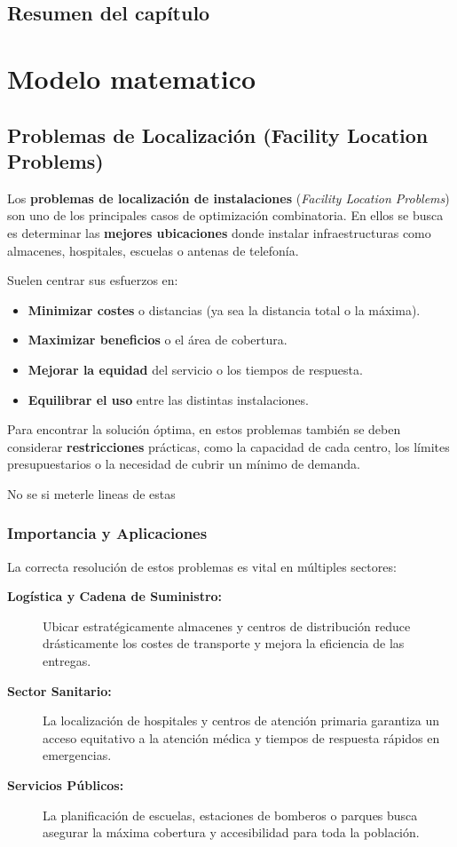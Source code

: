\documentclass[12pt,a4paper]{book}
\begin{document}
\section{Resumen del capítulo}

\chapter{Modelo matematico}

\section{Problemas de Localización (Facility Location Problems)}

Los \textbf{problemas de localización de instalaciones} (\textit{Facility Location Problems}) son uno de los principales casos de optimización combinatoria. En ellos se busca es determinar las \textbf{mejores ubicaciones} donde instalar infraestructuras como almacenes, hospitales, escuelas o antenas de telefonía.

Suelen centrar sus esfuerzos en:
\begin{itemize}
    \item \textbf{Minimizar costes} o distancias (ya sea la distancia total o la máxima).
    \item \textbf{Maximizar beneficios} o el área de cobertura.
    \item \textbf{Mejorar la equidad} del servicio o los tiempos de respuesta.
    \item \textbf{Equilibrar el uso} entre las distintas instalaciones.
\end{itemize}

Para encontrar la solución óptima, en estos problemas también se deben considerar \textbf{restricciones} prácticas, como la capacidad de cada centro, los límites presupuestarios o la necesidad de cubrir un mínimo de demanda.

\color{red}No se si meterle lineas de estas \color{black}

\hrulefill

\subsection{Importancia y Aplicaciones}

La correcta resolución de estos problemas es vital en múltiples sectores:
\begin{description}
    \item[\textbf{Logística y Cadena de Suministro:}] Ubicar estratégicamente almacenes y centros de distribución reduce drásticamente los costes de transporte y mejora la eficiencia de las entregas.
    \item[\textbf{Sector Sanitario:}] La localización de hospitales y centros de atención primaria garantiza un acceso equitativo a la atención médica y tiempos de respuesta rápidos en emergencias.
    \item[\textbf{Servicios Públicos:}] La planificación de escuelas, estaciones de bomberos o parques busca asegurar la máxima cobertura y accesibilidad para toda la población.
\end{description}
\end{document}
